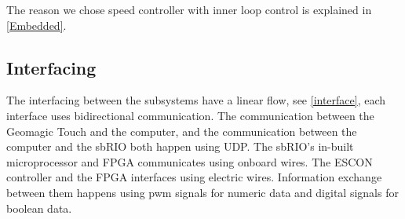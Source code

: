 The reason we chose speed controller with inner loop control is explained in \ref{Embedded}.

\subsection{Interfacing}

The interfacing between the subsystems have a linear flow, see \ref{interface}, each interface uses bidirectional communication. The communication between the Geomagic Touch and the computer, and the communication between the computer and the sbRIO both happen using UDP. The sbRIO's in-built microprocessor and FPGA communicates using onboard wires. The ESCON controller and the FPGA interfaces using electric wires. Information exchange between them happens using pwm signals for numeric data and digital signals for boolean data.




